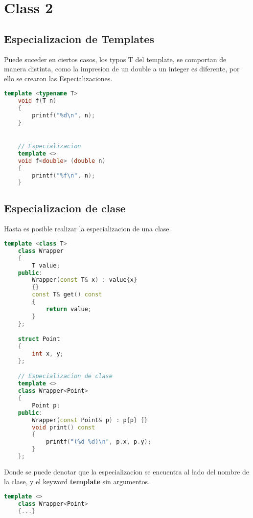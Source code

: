 \section{Class 2}

\subsection{Especializacion de Templates}
Puede suceder en ciertos casos, los typos T del template,
se comportan de manera distinta, como la impresion de un double a un integer 
es diferente, por ello se crearon las Especializaciones.
\begin{lstlisting}[language=C++, caption={'Especializacion 1'}]
    template <typename T>
    void f(T n)
    {
        printf("%d\n", n);
    }


    // Especializacion
    template <>
    void f<double> (double n)
    {
        printf("%f\n", n);
    }
\end{lstlisting}
 
\subsection{Especializacion de clase}
Hasta es posible realizar la especializacion de una clase.
\begin{lstlisting}[language=C++, caption={'Especializacion de clase'}]
    template <class T>
    class Wrapper
    {
        T value;
    public:
        Wrapper(const T& x) : value{x}
        {}
        const T& get() const
        {
            return value;
        }
    };

    struct Point
    {
        int x, y;
    };

    // Especializacion de clase
    template <>
    class Wrapper<Point>
    {
        Point p;
    public:
        Wrapper(const Point& p) : p{p} {}
        void print() const
        {
            printf("(%d %d)\n", p.x, p.y);
        }
    };
\end{lstlisting}
Donde se puede denotar que la especializacion se encuentra al lado del
nombre de la clase, y el keyword \textbf{template} sin argumentos.
\begin{lstlisting}[language=C++, caption={'Especializacion'}]
    template <>
    class Wrapper<Point>
    {...}
\end{lstlisting}

